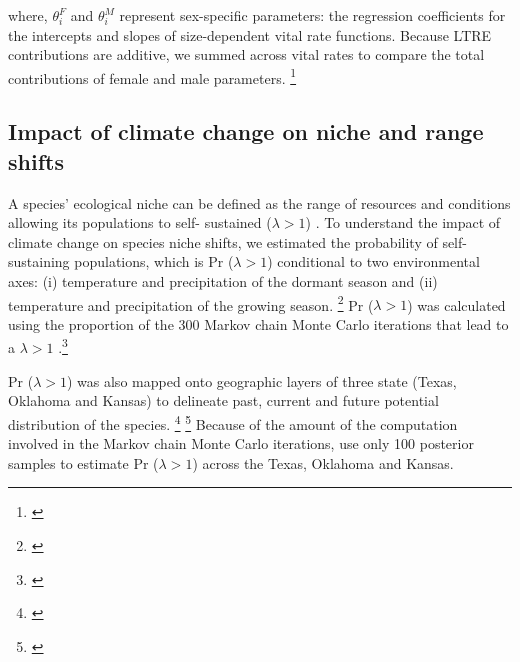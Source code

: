 \documentclass[12pt]{article}
\newcommand{\tom}[2]{{\color{red}{#1}}\footnote{\textit{\color{red}{#2}}}}
\begin{document}
\noindent where, $\theta^{F}_{i}$ and $\theta^{M}_{i}$ represent sex-specific parameters: the regression coefficients for the intercepts and slopes of size-dependent vital rate functions. 
Because LTRE contributions are additive, we summed across vital rates to compare the total contributions of female and male parameters. \tom{}{I don't really understand how this LTRE works because your climate variables interact. So this should not decompose as cleanly as the equation implies.}

\subsection*{Impact of climate change on niche and range shifts}
A species' ecological niche can be defined as the range of resources and conditions allowing its populations to self- sustained  ($\lambda > 1$) \citep{maguire1973niche,hutchinson1978introduction}.
To understand the impact of climate change on species niche shifts, we estimated the probability of self- sustaining populations, which is Pr ($\lambda > 1$) conditional to two environmental axes: (i) temperature and precipitation of the dormant season and (ii) temperature and precipitation of the growing season. \tom{}{As a general comment, I find it difficult to follow which analyses are explicitly spatial (i.e., mapping quantities as rasters) and which are not -- I think the methods can be sharpened around this.}
Pr ($\lambda > 1$) was calculated using the proportion of the 300 Markov chain Monte Carlo iterations that lead to a $\lambda > 1$ \citep{diez2014probabilistic}.\tom{}{I suggest you bring this up much earlier, in the Intro probably. I think you under-sell the value of this approach, particularly related to accounting for uncertainty. You also need to describe which types of uncertainty are accounted for here, i.e., process error and estimation error.}

Pr ($\lambda > 1$) was also mapped onto geographic layers of three state (Texas, Oklahoma and Kansas) to delineate past, current and future potential distribution of the species.
\tom{To do so, we estimated Pr ($\lambda > 1$) conditional to all climate covariates for each pixel ($\sim$340 km2) across the species range.}{I think you did this separately for past, present, and future, and for multiple futures? Needs to be explained.} 
\tom{Then we add the current occurrences record of the species (1990-2019) from Global Biodiversity Information Facility (GBIF) to validate the accuracy of our prediction}{If you actually intend this as model validation then it needs to be presented more thoroughly and analyzed more rigorously.}
Because of the amount of the computation involved in the Markov chain Monte Carlo iterations, use only 100 posterior samples to estimate Pr ($\lambda > 1$) across the Texas, Oklahoma and Kansas.
\end{document}

